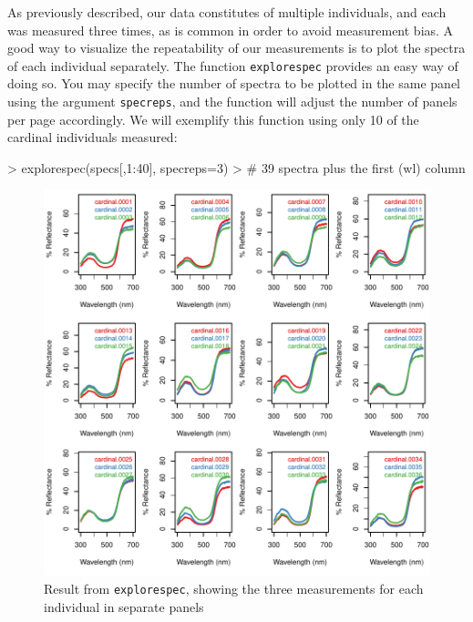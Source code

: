 \documentclass{article}
\newcommand{\code}[1]{{\tt #1}}  %
\begin{document}
As previously described, our data constitutes of multiple individuals, and each was measured 
three times, as is common in order to avoid measurement bias. A good way to visualize the 
repeatability of our measurements is to plot the spectra of each individual separately. The 
function \code{explorespec} provides an easy way of doing so. You may specify the number of 
spectra to be plotted in the same panel using the argument \code{specreps}, and the function 
will adjust the number of panels per page accordingly. We will exemplify this function using 
only 10 of the cardinal individuals measured:

\begin{Schunk}
\begin{Sinput}
> explorespec(specs[,1:40], specreps=3) 
> # 39 spectra plus the first (wl) column
\end{Sinput}
\end{Schunk}

\begin{figure} %
\begin{center}
\includegraphics[width=6in]{pavo-explorespecfig}
\end{center}
\caption{Result from \code{explorespec}, showing the three measurements for each individual in separate panels}
\label{fig1}
\end{figure}
\end{document}
